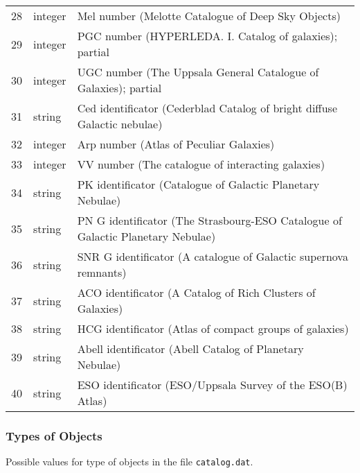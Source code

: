 \begin{longtable}{r|l|p{110mm}}
28 & integer & Mel number (Melotte Catalogue of Deep Sky Objects)\\
29 & integer & PGC number (HYPERLEDA. I. Catalog of galaxies); partial\\
30 & integer & UGC number (The Uppsala General Catalogue of Galaxies); partial\\
31 & string  & Ced identificator (Cederblad Catalog of bright diffuse Galactic nebulae)\\
32 & integer & Arp number (Atlas of Peculiar Galaxies)\\
33 & integer & VV number (The catalogue of interacting galaxies)\\
34 & string  & PK identificator (Catalogue of Galactic Planetary Nebulae)\\
35 & string  & PN G identificator (The Strasbourg-ESO Catalogue of Galactic Planetary Nebulae)\\
36 & string  & SNR G identificator (A catalogue of Galactic supernova remnants)\\
37 & string  & ACO identificator (A Catalog of Rich Clusters of Galaxies)\\
38 & string  & HCG identificator (Atlas of compact groups of galaxies)\\
39 & string  & Abell identificator (Abell Catalog of Planetary Nebulae)\\
40 & string  & ESO identificator (ESO/Uppsala Survey of the ESO(B) Atlas)\\
\bottomrule
\end{longtable}

\subsubsection{Types of Objects}
\label{sec:dso:types}

Possible values for type of objects in the file \texttt{catalog.dat}.

